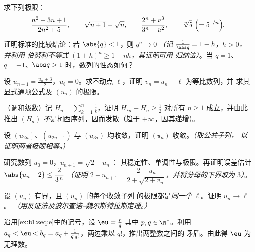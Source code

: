 \begin{exercise}[$\star$]\label{exo:b1:seq:2}
求下列极限：
\[
\frac{n^2 - 3n + 1}{2n^2 + 5},
\qquad
\sqrt{n+1} - \sqrt n,
\qquad
\frac{2^n + n^3}{3^n - n^2},
\qquad
\sqrt[n]{5}\ \Bigl(= 5^{1/n}\Bigr).
\]
\end{exercise}

\begin{exercise}[$\star$]\label{exo:b1:seq:3}
证明标准的比较结论：若 $\abs{q} < 1$，则 $q^n \to 0$
\emph{（记 $\frac{1}{\abs q} = 1 + h$，$h > 0$，并利用
伯努利不等式 $(1+h)^n \geq 1 + nh$，其证明可用
归纳法）}。当 $q = 1$、$q = -1$、$\abs q >
1$ 时，数列的性态如何？
\end{exercise}

\begin{exercise}[$\star$]\label{exo:b1:seq:4}
设 $u_{n+1} = \frac{u_n + 3}{2}$，$u_0 = 0$。求不动点
$\ell$，证明 $v_n = u_n - \ell$ 为等比数列，并
求其显式通项公式及 $(u_n)$ 的极限。
\end{exercise}

\begin{exercise}[$\star\star$]\label{exo:b1:seq:5}
（调和级数）记 $H_n = \sum_{k=1}^{n} \frac 1k$，证明
$H_{2n} - H_n \geq \frac12$ 对所有 $n \geq 1$ 成立，并由此推出
$(H_n)$ \emph{不}是柯西序列，因而发散（趋于
$+\infty$，因其递增）。
\end{exercise}

\begin{exercise}[$\star\star$]\label{exo:b1:seq:6}
设 $(u_{2n})$、$(u_{2n+1})$ 与 $(u_{3n})$ 均收敛，证明
$(u_n)$ 收敛。\emph{（取公共子列，
以证明两者极限相等。）}
\end{exercise}

\begin{exercise}[$\star\star$]\label{exo:b1:seq:7}
研究数列 $u_0 = 0$，$u_{n+1} = \sqrt{2 + u_n}$：
其稳定性、单调性与极限。再证明误差估计
$\abs{u_n - 2} \leq \dfrac{2}{3^{\,n}}$ \emph{（证明 $2 - u_{n+1} =
\dfrac{2 - u_n}{2 + \sqrt{2 + u_n}}$，并将分母的下界取为
$3$）}。
\end{exercise}

\begin{exercise}[$\star\star$]\label{exo:b1:seq:8}
设 $(u_n)$ 有界，且 $(u_n)$ 的每个收敛子列
的极限都是\emph{同一个} $\ell$。证明 $u_n \to \ell$。
\emph{（用反证法及波尔查诺--魏尔斯特拉斯定理。）}
\end{exercise}

\begin{exercise}[$\star\star\star$]\label{exo:b1:seq:9}
沿用\cref{ex:b1:seq:e}中的记号，设 $\eu = \frac pq$
其中 $p, q \in \N^*$。利用 $a_q < \eu < b_q = a_q + \frac{1}{q\,
q!}$，两边乘以 $q!$，推出两整数之间的
矛盾。由此得 $\eu$ 为无理数。
\end{exercise}

